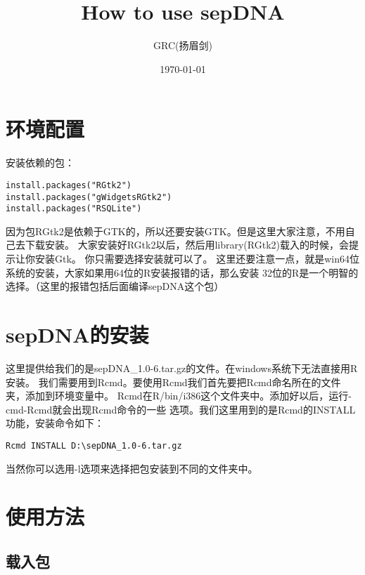 \documentclass{ctexart}
\title{How to use sepDNA}
\author{GRC(扬眉剑)}
\date{\today}
\begin{document}
\maketitle

\setcounter{tocdepth}{3}
\tableofcontents
\vspace*{1cm}
\section{环境配置}
\label{sec-1}

安装依赖的包：

\begin{lstlisting}
install.packages("RGtk2")
install.packages("gWidgetsRGtk2")
install.packages("RSQLite")
\end{lstlisting}

因为包RGtk2是依赖于GTK的，所以还要安装GTK。但是这里大家注意，不用自己去下载安装。
大家安装好RGtk2以后，然后用library(RGtk2)载入的时候，会提示让你安装Gtk。
你只需要选择安装就可以了。
这里还要注意一点，就是win64位系统的安装，大家如果用64位的R安装报错的话，那么安装
32位的R是一个明智的选择。（这里的报错包括后面编译sepDNA这个包）
\section{sepDNA的安装}
\label{sec-2}

这里提供给我们的是sepDNA\_1.0-6.tar.gz的文件。在windows系统下无法直接用R安装。
我们需要用到Rcmd。要使用Rcmd我们首先要把Rcmd命名所在的文件夹，添加到环境变量中。
Rcmd在R/bin/i386这个文件夹中。添加好以后，运行-cmd-Rcmd就会出现Rcmd命令的一些
选项。我们这里用到的是Rcmd的INSTALL功能，安装命令如下：

\begin{lstlisting}
Rcmd INSTALL D:\sepDNA_1.0-6.tar.gz
\end{lstlisting}
当然你可以选用-l选项来选择把包安装到不同的文件夹中。
\section{使用方法}
\label{sec-3}
\subsection{载入包}
\label{sec-3-1}
\end{document}
